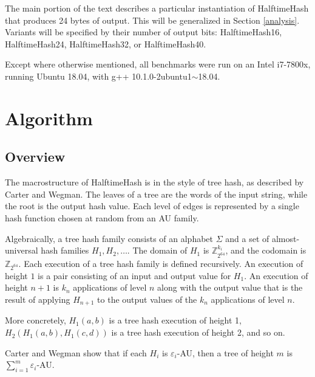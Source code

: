 \documentclass[sigconf, nonacm]{acmart}
\newcommand{\ints}{\mathbb{Z}}
\begin{document}
The main portion of the text describes a particular instantiation of HalftimeHash that produces 24 bytes of output.
This will be generalized in Section \ref{analysis}.
Variants will be specified by their number of output bits: HalftimeHash16, HalftimeHash24, HalftimeHash32, or HalftimeHash40.

Except where otherwise mentioned, all benchmarks were run on an Intel i7-7800x, running Ubuntu 18.04, with g++ 10.1.0-2ubuntu1$\sim{}$18.04.

\section{Algorithm}
\label{algo}

\subsection{Overview}

The macrostructure of HalftimeHash is in the style of tree hash, as described by Carter and Wegman. \cite{carter-wegman-79}
The leaves of a tree are the words of the input string, while the root is the output hash value.
Each level of edges is represented by a single hash function chosen at random from an AU family.

Algebraically, a tree hash family consists of an alphabet $\Sigma$ and a set of almost-universal hash families $H_1, H_2, \dots$.
The domain of $H_1$ is $\ints_{2^{64}}^{k_i}$, and the codomain is $\ints_{2^{64}}$.
Each execution of a tree hash family is defined recursively.
An execution of height $1$ is a pair consisting of an input and output value for $H_1$.
An execution of height $n+1$ is $k_n$ applications of level $n$ along with the output value that is the result of applying $H_{n+1}$ to the output values of the $k_n$ applications of level $n$.

More concretely, $H_1(a,b)$ is a tree hash execution of height 1, $H_2(H_1(a,b), H_1(c,d))$ is a tree hash execution of height 2, and so on.

Carter and Wegman show that if each $H_i$ is $\varepsilon_i$-AU, then a tree of height $m$ is $\sum_{i=1}^m \varepsilon_i$-AU.
\end{document}
